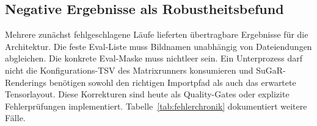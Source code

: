 \subsection{Negative Ergebnisse als Robustheitsbefund}

Mehrere zunächst fehlgeschlagene Läufe lieferten übertragbare Ergebnisse für
die Architektur. Die feste Eval-Liste muss Bildnamen unabhängig von
Dateiendungen abgleichen. Die konkrete Eval-Maske muss nichtleer sein. Ein
Unterprozess darf nicht die Konfigurations-TSV des Matrixrunners konsumieren
und SuGaR-Renderings benötigen sowohl den richtigen Importpfad als auch das
erwartete Tensorlayout. Diese Korrekturen sind heute als Quality-Gates oder
explizite Fehlerprüfungen implementiert. Tabelle~\ref{tab:fehlerchronik}
dokumentiert weitere Fälle.
